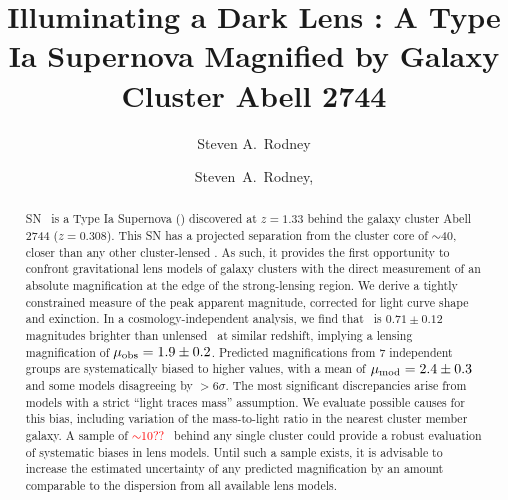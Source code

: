 







\title{Illuminating a Dark Lens : A Type Ia Supernova Magnified by Galaxy Cluster Abell 2744}

\ifms
    \author{Steven A.~Rodney}
    \author{\etal{}}

\else 
    \author{
      Steven~A.~Rodney,
      \etal{}
    }
\fi



\begin{abstract}
SN \tomas\ is a Type Ia Supernova (\SNIa) discovered at $z=1.33$
behind the galaxy cluster Abell 2744 ($z=0.308$). This SN has a
projected separation from the cluster core of $\sim$40\arcsec, closer
than any other cluster-lensed \SNIa.  As such, it provides the first
opportunity to confront gravitational lens models of galaxy clusters
with the direct measurement of an absolute magnification at the edge
of the strong-lensing region.  We derive a tightly constrained measure
of the peak apparent magnitude, corrected for light curve shape and
exinction.  In a cosmology-independent analysis, we find that \tomas\
is $0.71\pm0.12$ magnitudes brighter than unlensed \SNeIa\ at similar
redshift, implying a lensing magnification of $\mu_{\rm
obs}=1.9\pm0.2$.  Predicted magnifications from 7 independent groups
are systematically biased to higher values, with a mean of $\mu_{\rm
mod}=2.4\pm0.3$ and some models disagreeing by $>6\sigma$.  The most
significant discrepancies arise from models with a strict ``light
traces mass'' assumption.  We evaluate possible causes for this bias,
including variation of the mass-to-light ratio in the nearest cluster
member galaxy.  A sample of \textcolor{red}{$\sim$10??} \SNeIa\ behind
any single cluster could provide a robust evaluation of systematic
biases in lens models.  Until such a sample exists, it is advisable to
increase the estimated uncertainty of any predicted magnification
by an amount comparable to the dispersion from all available lens
models.

\end{abstract}


